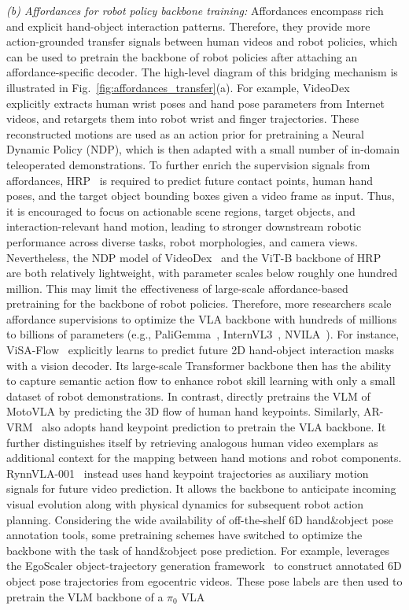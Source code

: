 \documentclass[Afour,sageh,times]{sagej}
\begin{document}
\textit{(b) Affordances for robot policy backbone training:} Affordances encompass rich and explicit hand-object interaction patterns. Therefore, they provide more action-grounded transfer signals between human videos and robot policies, which can be used to pretrain the backbone of robot policies after attaching an affordance-specific decoder. The high-level diagram of this bridging mechanism is illustrated in Fig.~\ref{fig:affordances_transfer}(a). For example, VideoDex~\citep{shaw2023videodex} explicitly extracts human wrist poses and hand pose parameters from Internet videos, and retargets them into robot wrist and finger trajectories. These reconstructed motions are used as an action prior for pretraining a Neural Dynamic Policy (NDP), which is then adapted with a small number of in-domain teleoperated demonstrations. To further enrich the supervision signals from affordances, HRP~\citep{srirama2024hrp} is required to predict future contact points, human hand poses, and the target object bounding boxes given a video frame as input. Thus, it is encouraged to focus on actionable scene regions, target objects, and interaction-relevant hand motion, leading to stronger downstream robotic performance across diverse tasks, robot morphologies, and camera views. Nevertheless, the NDP model of VideoDex~\citep{shaw2023videodex} and the ViT-B backbone of HRP~\citep{srirama2024hrp} are both relatively lightweight, with parameter scales below roughly one hundred million. This may limit the effectiveness of large-scale affordance-based pretraining for the backbone of robot policies. Therefore, more researchers scale affordance supervisions to optimize the VLA backbone with hundreds of millions to billions of parameters (e.g., PaliGemma~\citep{beyer2024paligemma}, InternVL3~\citep{chen2024expanding}, NVILA~\citep{liu2025nvila}). For instance, ViSA-Flow~\citep{chen2025visa} explicitly learns to predict future 2D hand-object interaction masks with a vision decoder. Its large-scale Transformer backbone then has the ability to capture semantic action flow to enhance robot skill learning with only a small dataset of robot demonstrations. In contrast, \cite{spiridonov2025generalist} directly pretrains the VLM of MotoVLA by predicting the 3D flow of human hand keypoints. Similarly, AR-VRM~\citep{yang2025ar} also adopts hand keypoint prediction to pretrain the VLA backbone. It further distinguishes itself by retrieving analogous human video exemplars as additional context for the mapping between hand motions and robot components. RynnVLA-001~\citep{jiang2025rynnvla} instead uses hand keypoint trajectories as auxiliary motion signals for future video prediction. It allows the backbone to anticipate incoming visual evolution along with physical dynamics for subsequent robot action planning. Considering the wide availability of off-the-shelf 6D hand\&object pose annotation tools, some pretraining schemes have switched to optimize the backbone with the task of hand\&object pose prediction. For example, \cite{yoshida2025developing} leverages the EgoScaler object-trajectory generation framework~\citep{yoshida2025generating} to construct annotated 6D object pose trajectories from egocentric videos. These pose labels are then used to pretrain the VLM backbone of a $\pi_0$ VLA 
\end{document}
